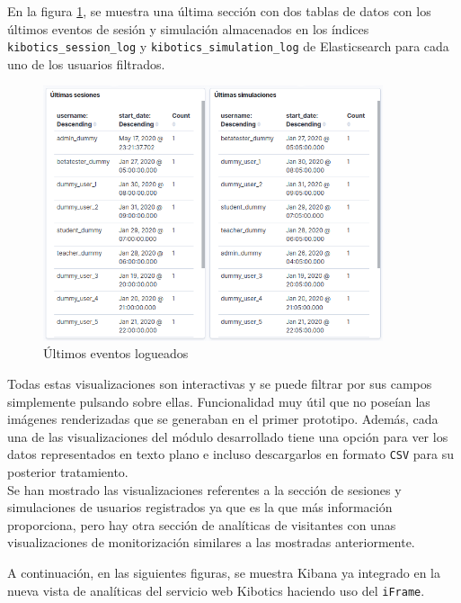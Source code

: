 \documentclass[a4paper, 12pt]{book}
\begin{document}
		En la figura \ref{fig:kibana_latestevent}, se muestra una última sección con dos tablas de datos con los últimos eventos de sesión y simulación almacenados en los índices \texttt{kibotics\_session\_log} y \texttt{kibotics\_simulation\_log} de Elasticsearch para cada uno de los usuarios filtrados. 
		\begin{figure}[H]
			\centering
			\includegraphics[width=10cm, keepaspectratio]{img/kibana_08_latest_event}
			\caption{Últimos eventos logueados}
			\label{fig:kibana_latestevent}
		\end{figure}
		
		Todas estas visualizaciones son interactivas y se puede filtrar por sus campos simplemente pulsando sobre ellas. Funcionalidad muy útil que no poseían las imágenes renderizadas que se generaban en el primer prototipo. Además, cada una de las visualizaciones del módulo desarrollado tiene una opción para ver los datos representados en texto plano e incluso descargarlos en formato \texttt{CSV} para su posterior tratamiento.\\
		
		Se han mostrado las visualizaciones referentes a la sección de sesiones y simulaciones de usuarios registrados ya que es la que más información proporciona, pero hay otra sección de analíticas de visitantes con unas visualizaciones de monitorización similares a las mostradas anteriormente.
		
	 	A continuación, en las siguientes figuras, se muestra Kibana ya integrado en la nueva vista de analíticas del servicio web Kibotics haciendo uso del \texttt{iFrame}.
		
\end{document}
